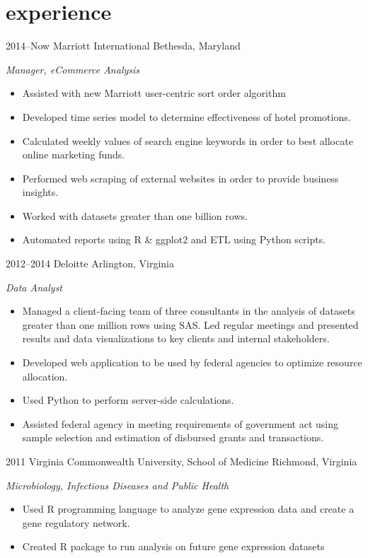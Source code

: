 \documentclass[]{friggeri-cv}
\begin{document}
\section{experience}

\begin{entrylist}
\entry
{2014--Now}
{Marriott International}
{Bethesda, Maryland}
{\emph{Manager, eCommerce Analysis}
\begin{itemize}
\renewcommand\labelitemi{--}
\item Assisted with new Marriott user-centric sort order algorithm
\item Developed time series model to determine effectiveness of hotel promotions. 
\item Calculated weekly values of search engine keywords in order to best allocate online marketing funds.
\item Performed web scraping of external websites in order to provide business insights.
\item Worked with datasets greater than one billion rows.
\item Automated reports using R \& ggplot2 and ETL using Python scripts.
\end{itemize}
}
\entry
{2012--2014}
{Deloitte}
{Arlington, Virginia}
{\emph{Data Analyst}
\begin{itemize}
\renewcommand\labelitemi{--}
\item Managed a client-facing team of three consultants in the analysis of datasets greater than one million rows using SAS. 
Led regular meetings and presented results and data visualizations to key clients and internal stakeholders.
\item Developed web application to be used by federal agencies to optimize resource allocation. 
\item Used Python to perform server-side calculations.
\item Assisted federal agency in meeting requirements of government act using sample selection and estimation of disbursed grants and transactions.
\end{itemize}
}
\entry
{2011}
{Virginia Commonwealth University, School of Medicine}
{Richmond, Virginia}
{\emph{Microbiology, Infectious Diseases and Public Health}
\begin{itemize}
\renewcommand\labelitemi{--}
\item Used R programming language to analyze gene expression data and create a gene regulatory network.
\item Created R package to run analysis on future gene expression datasets
\end{itemize}
}
\end{entrylist}
\end{document}
